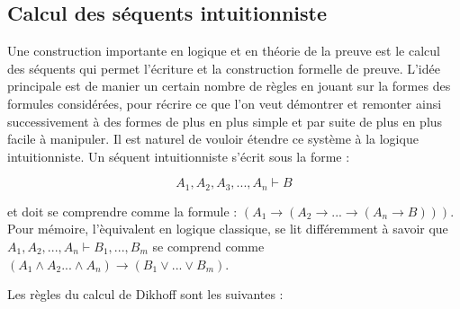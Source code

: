 \subsection{Calcul des s\'equents intuitionniste}

Une construction importante en logique et en th\'eorie de la preuve est le calcul des s\'equents qui permet l'\'ecriture et la construction formelle de preuve. L'id\'ee principale est de manier un certain nombre de r\`egles en jouant sur la formes des formules consid\'er\'ees, pour r\'ecrire ce que l'on veut d\'emontrer et remonter ainsi successivement \`a des formes de plus en plus simple et par suite de plus en plus facile \`a manipuler. Il est naturel de vouloir \'etendre ce syst\`eme \`a la logique intuitionniste.
Un s\'equent intuitionniste s'\'ecrit sous la forme :

$$A_1, A_2, A_3, ..., A_n \vdash B$$

et doit se comprendre comme la formule : $(A_1 \to (A_2 \to ... \to (A_n \to B)))$. Pour m\'emoire, l'\`equivalent en logique classique, se lit diff\'eremment à savoir que $A_1, A_2, ..., A_n \vdash B_1, ..., B_m$ se comprend comme $(A_1 \land A_2 ... \land A_n) \to (B_1 \lor ... \lor B_m)$.

Les r\`egles du calcul de Dikhoff sont les suivantes :

